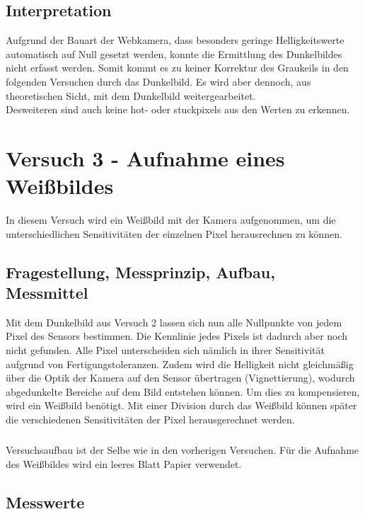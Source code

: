 \documentclass[12pt,oneside,a4paper]{report}
\begin{document}
\section{Interpretation}
\label{chap:VERSUCH_2_INTERPRETATION}
Aufgrund der Bauart der Webkamera, dass besonders geringe Helligkeitswerte automatisch auf Null gesetzt werden, konnte die Ermittlung des Dunkelbildes nicht erfasst werden. Somit kommt es zu keiner Korrektur des Graukeils in den folgenden Versuchen durch das Dunkelbild. Es wird aber dennoch, aus theoretischen Sicht, mit dem Dunkelbild weitergearbeitet.\\
Desweiteren sind auch keine hot- oder stuckpixels aus den Werten zu erkennen.

%
%
\chapter{Versuch 3 - Aufnahme eines Weißbildes}
\label{chap:VERSUCH_3}

In diesem Versuch wird ein Weißbild mit der Kamera aufgenommen, um die unterschiedlichen Sensitivitäten der einzelnen Pixel herausrechnen zu können.

\section{Fragestellung, Messprinzip, Aufbau, Messmittel}
\label{chap:VERSUCH_3_FRAGESTELLUNG}

Mit dem Dunkelbild aus Versuch 2 lassen sich nun alle Nullpunkte von jedem Pixel des Sensors bestimmen. Die Kennlinie jedes Pixels ist dadurch aber noch nicht gefunden.
Alle Pixel unterscheiden sich nämlich in ihrer Sensitivität aufgrund von Fertigungstoleranzen. Zudem wird die Helligkeit nicht gleichmäßig über die Optik der Kamera auf den Sensor übertragen (Vignettierung), wodurch abgedunkelte Bereiche auf dem Bild entstehen können. Um dies zu kompensieren, wird ein Weißbild benötigt. Mit einer Division durch das Weißbild können später die verschiedenen Sensitivitäten der Pixel herausgerechnet werden.
\paragraph{}
Versuchsaufbau ist der Selbe wie in den vorherigen Versuchen. Für die Aufnahme des Weißbildes wird ein leeres Blatt Papier verwendet.

\section{Messwerte}
\label{chap:VERSUCH_3_MESSWERTE}
\end{document}
